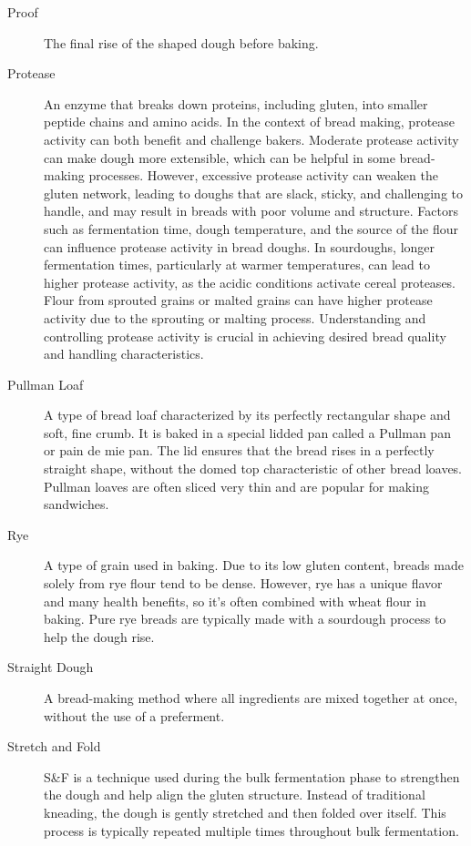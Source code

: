 \begin{description}
\item[Proof] The final rise of the shaped dough before baking.

\item[Protease] An enzyme that breaks down proteins, including gluten, into smaller
peptide chains and amino acids. In the context of bread making, protease activity can
both benefit and challenge bakers. Moderate protease activity can make dough more
extensible, which can be helpful in some bread-making processes. However, excessive
protease activity can weaken the gluten network, leading to doughs that are slack,
sticky, and challenging to handle, and may result in breads with poor volume and
structure. Factors such as fermentation time, dough temperature, and the source of the
flour can influence protease activity in bread doughs. In sourdoughs, longer
fermentation times, particularly at warmer temperatures, can lead to higher protease
activity, as the acidic conditions activate cereal proteases. Flour from sprouted
grains or malted grains can have higher protease activity due to the sprouting or
malting process. Understanding and controlling protease activity is crucial in
achieving desired bread quality and handling characteristics.

\item[Pullman Loaf] A type of bread loaf characterized by its perfectly rectangular
shape and soft, fine crumb. It is baked in a special lidded pan called a Pullman pan
or pain de mie pan. The lid ensures that the bread rises in a perfectly straight
shape, without the domed top characteristic of other bread loaves. Pullman loaves are
often sliced very thin and are popular for making sandwiches.

\item[Rye] A type of grain used in baking. Due to its low gluten content, breads
made solely from rye flour tend to be dense. However, rye has a unique flavor and
many health benefits, so it's often combined with wheat flour in baking. Pure rye
breads are typically made with a sourdough process to help the dough rise.

\item[Straight Dough] A bread-making method where all ingredients are mixed
together at once, without the use of a preferment.

\item[Stretch and Fold] S\&F is a technique used during the bulk fermentation phase
to strengthen the dough and help align the gluten structure. Instead of traditional
kneading, the dough is gently stretched and then folded over itself. This process is
typically repeated multiple times throughout bulk fermentation.


\end{description}
